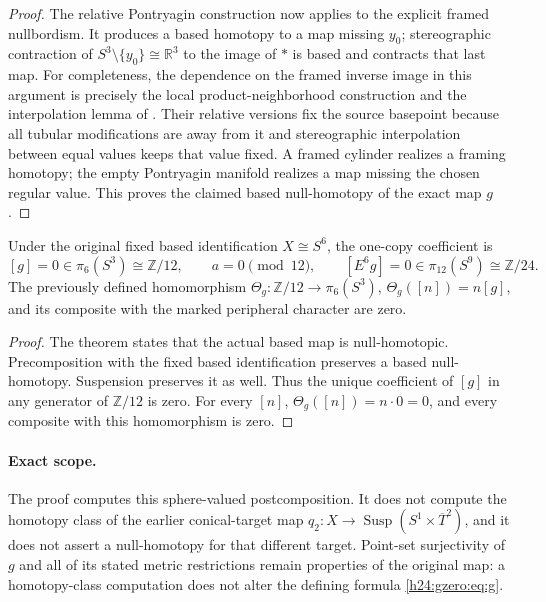 \begin{proof}
The relative Pontryagin construction now applies to the explicit
framed nullbordism. It produces a based homotopy to a map missing
\(y_0\); stereographic contraction of \(S^3\setminus\{y_0\}\cong\mathbb R^3\)
to the image of \(*\) is based and contracts that last map.
For completeness, the dependence on the framed inverse image in this
argument is precisely the local product-neighborhood construction and
the interpolation lemma of \cite[\S7, Theorem B and Lemma 4,
pp.~43, 48--50]{h24:Milnor1965}. Their relative versions fix the source
basepoint because all tubular modifications are away from it and
stereographic interpolation between equal values keeps that value
fixed. A framed cylinder realizes a framing homotopy; the empty
Pontryagin manifold realizes a map missing the chosen regular value.
This proves the claimed based null-homotopy of the exact map \(g\).
\end{proof}

\begin{corollary}
Under the original fixed based identification \(X\cong S^6\), the
one-copy coefficient is
\[
 [g]=0\in\pi_6(S^3)\cong\mathbb Z/12,\qquad a=0\pmod{12},\qquad
 [E^6g]=0\in\pi_{12}(S^9)\cong\mathbb Z/24.
\]
The previously defined homomorphism
\(\Theta_g:\mathbb Z/12\to\pi_6(S^3)\), \(\Theta_g([n])=n[g]\), and
its composite with the marked peripheral character are zero.
\end{corollary}
\begin{proof}
The theorem states that the actual based map is null-homotopic.
Precomposition with the fixed based identification preserves a based
null-homotopy. Suspension preserves it as well. Thus the unique
coefficient of \([g]\) in any generator of \(\mathbb Z/12\) is zero.
For every \([n]\), \(\Theta_g([n])=n\cdot0=0\), and every
composite with this homomorphism is zero.
\end{proof}

\paragraph{Exact scope.}
The proof computes this sphere-valued postcomposition. It does not
compute the homotopy class of the earlier conical-target map
\(q_2:X\to\operatorname{Susp}(S^1\times\overline T^2)\), and it
does not assert a null-homotopy for that different target. Point-set
surjectivity of \(g\) and all of its stated metric restrictions remain
properties of the original map: a homotopy-class computation does not
alter the defining formula \eqref{h24:gzero:eq:g}.

